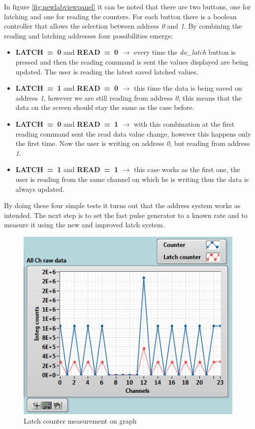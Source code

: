 In figure \ref{fig:newlabviewpanel} it can be noted that there are two buttons, one for latching and one for reading the counters. For each button there is a boolean controller that allows the selection between address \textit{0} and \textit{1}.
By combining the reading and latching addresses four possibilities emerge:
\begin{itemize}
	\item \textbf{LATCH~=~0} and \textbf{READ~=~0 $\rightarrow$} every time the \textit{do\_latch} button is pressed and then the reading command is sent the values displayed are being updated. The user is reading the latest saved latched values.
	\item \textbf{LATCH~=~1} and \textbf{READ~=~0 $\rightarrow$} this time the data is being saved on address \textit{1}, however we are still reading from address \textit{0}, this means that the data on the screen should stay the same as the case before.
	\item \textbf{LATCH~=~0} and \textbf{READ~=~1 $\rightarrow$} with this combination at the first reading command sent the read data value change, however this happens only the first time. Now the user is writing on address \textit{0}, but reading from address \textit{1}. 
	\item \textbf{LATCH~=~1} and \textbf{READ~=~1 $\rightarrow$} this case works as the first one, the user is reading from the same channel on which he is writing thus the data is always updated. 
\end{itemize}
\noindent By doing these four simple tests it turns out that the address system works as intended. The next step is to set the fast pulse generator to a known rate and to measure it using the new and improved latch system.
\begin{figure}[H]
	\centering
	\includegraphics[width=0.5\linewidth]{IMG/ch5/latch_tests/fig2.PNG}
	\caption{Latch counter measurement on graph}
	\label{fig:latchfigure}
\end{figure}
